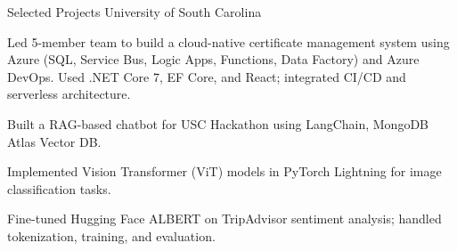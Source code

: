 \begin{cventries}

    \cventry
        {Selected Projects} 
        {University of South Carolina} 
        {} 
        {} 
        {
            \begin{cvitemsfree}
                \item{Led 5-member team to build a cloud-native certificate management system using Azure (SQL, Service Bus, Logic Apps, Functions, Data Factory) and Azure DevOps. Used .NET Core 7, EF Core, and React; integrated CI/CD and serverless architecture.}
                \item{Built a RAG-based chatbot for USC Hackathon using LangChain, MongoDB Atlas Vector DB.}
                \item{Implemented Vision Transformer (ViT) models in PyTorch Lightning for image classification tasks.}
                \item{Fine-tuned Hugging Face ALBERT on TripAdvisor sentiment analysis; handled tokenization, training, and evaluation.}
            \end{cvitemsfree}
        }
\end{cventries}